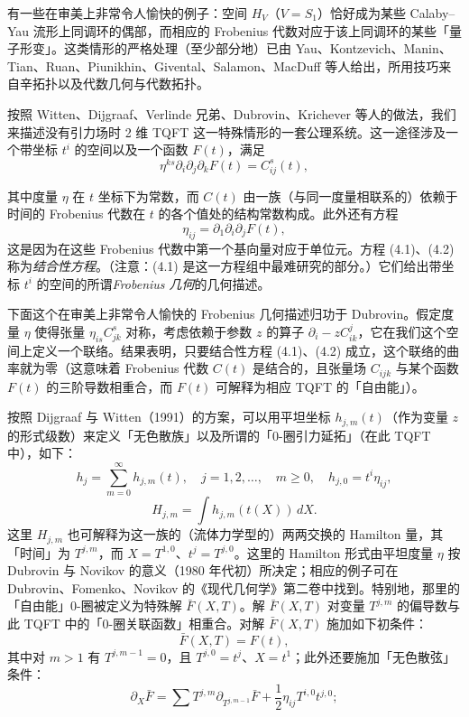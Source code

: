 \begin{remark}{}
有一些在审美上非常令人愉快的例子：空间 $H_V$（$V=S_1$）恰好成为某些 Calaby--Yau 流形上同调环的偶部，而相应的 Frobenius 代数对应于该上同调环的某些「量子形变」。这类情形的严格处理（至少部分地）已由 Yau、Kontzevich、Manin、Tian、Ruan、Piunikhin、Givental、Salamon、MacDuff 等人给出，所用技巧来自辛拓扑以及代数几何与代数拓扑。
\end{remark}


按照 Witten、Dijgraaf、Verlinde 兄弟、Dubrovin、Krichever 等人的做法，我们来描述没有引力场时 2 维 TQFT 这一特殊情形的一套公理系统。这一途径涉及一个带坐标 $t^i$ 的空间以及一个函数 $F(t)$，满足
\begin{equation}
\eta^{ks}\partial_i\partial_j\partial_kF(t)=C_{ij}^s(t),\tag{4.1}
\end{equation}


其中度量 $\eta$ 在 $t$ 坐标下为常数，而 $C(t)$ 由一族（与同一度量相联系的）依赖于时间的 Frobenius 代数在 $t$ 的各个值处的结构常数构成。此外还有方程
\begin{equation}
\eta_{ij}=\partial_1\partial_i\partial_jF(t),\tag{4.2}
\end{equation}
这是因为在这些 Frobenius 代数中第一个基向量对应于单位元。方程 (4.1)、(4.2) 称为\emph{结合性方程}。（注意：(4.1) 是这一方程组中最难研究的部分。）它们给出带坐标 $t^i$ 的空间的所谓\emph{Frobenius 几何}的几何描述。

下面这个在审美上非常令人愉快的 Frobenius 几何描述归功于 Dubrovin。假定度量 $\eta$ 使得张量 $\eta_{is}C_{jk}^s$ 对称，考虑依赖于参数 $z$ 的算子 $\partial_i-zC_{ik}^j$，它在我们这个空间上定义一个联络。结果表明，只要结合性方程 (4.1)、(4.2) 成立，这个联络的曲率就为零（这意味着 Frobenius 代数 $C(t)$ 是结合的，且张量场 $C_{ijk}$ 与某个函数 $F(t)$ 的三阶导数相重合，而 $F(t)$ 可解释为相应 TQFT 的「自由能」）。

按照 Dijgraaf 与 Witten（1991）的方案，可以用平坦坐标 $h_{j,m}(t)$（作为变量 $z$ 的形式级数）来定义「无色散族」以及所谓的「0-圈引力延拓」（在此 TQFT 中），如下：
\[
h_j=\sum_{m=0}^{\infty}h_{j,m}(t),\quad j=1,2,\dots,\quad m\ge0,\quad h_{j,0}=t^i\eta_{ij},
\]
\[
H_{j,m}=\int h_{j,m}(t(X))\,dX.
\]
这里 $H_{j,m}$ 也可解释为这一族的（流体力学型的）两两交换的 Hamilton 量，其「时间」为 $T^{j,m}$，而 $X=T^{1,0}$、$t^j=T^{j,0}$。这里的 Hamilton 形式由平坦度量 $\eta$ 按 Dubrovin 与 Novikov 的意义（1980 年代初）所决定；相应的例子可在 Dubrovin、Fomenko、Novikov 的《现代几何学》第二卷中找到。特别地，那里的「自由能」0-圈被定义为特殊解 $\bar F(X,T)$。解 $\bar F(X,T)$ 对变量 $T^{j,m}$ 的偏导数与此 TQFT 中的「0-圈关联函数」相重合。对解 $\bar F(X,T)$ 施加如下初条件：
\[
\bar F(X,T)=F(t),
\]
其中对 $m>1$ 有 $T^{j,m-1}=0$，且 $T^{j,0}=t^j$、$X=t^1$；此外还要施加「无色散弦」条件：
\[
\partial_X\bar F=\sum T^{j,m}\partial_{T^{j,m-1}}\bar F+\frac12\eta_{ij}T^{i,0}t^{j,0};
\]


